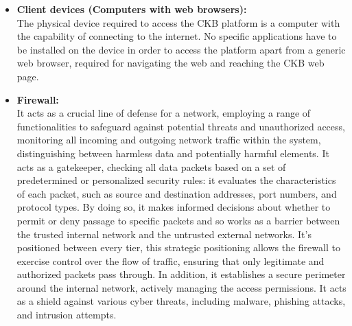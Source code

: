 \begin{itemize}
    \item \textbf{Client devices (Computers with web browsers):} \\
    The physical device required to access the CKB platform is a computer with the capability of connecting to the internet. No specific applications have to be installed on the device in order to access the platform apart from a generic web browser, required for navigating the web and reaching the CKB web page.
    \item \textbf{Firewall:} \\
    It acts as a crucial line of defense for a network, employing a range of functionalities to safeguard against potential threats and unauthorized access, monitoring all incoming and outgoing network traffic within the system, distinguishing between harmless data and potentially harmful elements. It acts as a gatekeeper, checking all data packets based on a set of predetermined or personalized security rules: it evaluates the characteristics of each packet, such as source and destination addresses, port numbers, and protocol types. By doing so, it makes informed decisions about whether to permit or deny passage to specific packets and so works as a barrier between the trusted internal network and the untrusted external networks. It’s positioned between every tier, this strategic positioning allows the firewall to exercise control over the flow of traffic, ensuring that only legitimate and authorized packets pass through. In addition, it establishes a secure perimeter around the internal network, actively managing the access permissions. It acts as a shield against various cyber threats, including malware, phishing attacks, and intrusion attempts.


\end{itemize}
